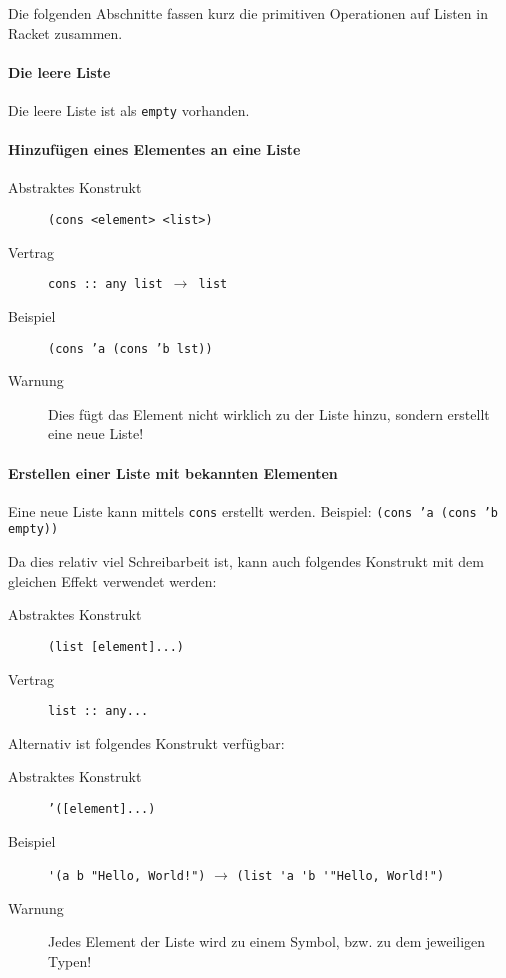 				Die folgenden Abschnitte fassen kurz die primitiven Operationen auf Listen in Racket zusammen.

				\paragraph{Die leere Liste}
					Die leere Liste ist als \texttt{empty} vorhanden.

				\paragraph{Hinzufügen eines Elementes an eine Liste}
					\begin{description}
						\item[Abstraktes Konstrukt] \texttt{(cons <element> <list>)}
						\item[Vertrag] \texttt{cons :: any list $ \rightarrow $ list}
						\item[Beispiel] \texttt{(cons 'a (cons 'b lst))}
						\item[Warnung] Dies fügt das Element nicht wirklich zu der Liste hinzu, sondern erstellt eine neue Liste!
					\end{description}

				\paragraph{Erstellen einer Liste mit bekannten Elementen}
					Eine neue Liste kann mittels \texttt{cons} erstellt werden. Beispiel: \texttt{(cons 'a (cons 'b empty))}

					Da dies relativ viel Schreibarbeit ist, kann auch folgendes Konstrukt mit dem gleichen Effekt verwendet werden:
					\begin{description}
						\item[Abstraktes Konstrukt] \texttt{(list [element]...)}
						\item[Vertrag] \texttt{list :: any...}
					\end{description}

					Alternativ ist folgendes Konstrukt verfügbar:
					\begin{description}
						\item[Abstraktes Konstrukt] \texttt{'([element]...)}
						\item[Beispiel] \verb$'(a b "Hello, World!")$ $ \rightarrow $ \verb$(list 'a 'b '"Hello, World!")$
						\item[Warnung] Jedes Element der Liste wird zu einem Symbol, bzw. zu dem jeweiligen Typen!
					\end{description}

